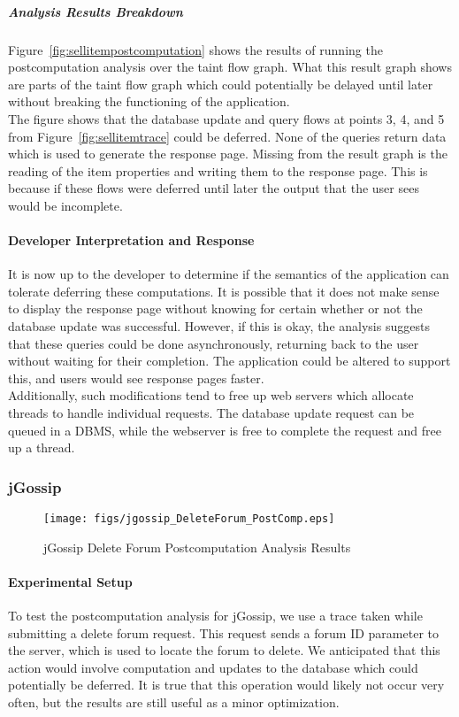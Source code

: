 \documentclass[msc,oneside]{ubcthesis}
\begin{document}
\subparagraph{Analysis Results Breakdown}
Figure~\ref{fig:sellitempostcomputation} shows the results of running the postcomputation analysis over the taint flow graph. What this result graph shows are parts of the taint flow graph which could potentially be delayed until later without breaking the functioning of the application.\\

The figure shows that the database update and query flows at points 3, 4, and 5 from Figure~\ref{fig:sellitemtrace} could be deferred. None of the queries return data which is used to generate the response page. Missing from the result graph is the reading of the item properties and writing them to the response page. This is because if these flows were deferred until later the output that the user sees would be incomplete.

\paragraph{Developer Interpretation and Response}
It is now up to the developer to determine if the semantics of the application can tolerate deferring these computations. It is possible that it does not make sense to display the response page without knowing for certain whether or not the database update was successful. However, if this is okay, the analysis suggests that these queries could be done asynchronously, returning back to the user without waiting for their completion. The application could be altered to support this, and users would see response pages faster. \\

Additionally, such modifications tend to free up web servers which allocate threads to handle individual requests. The database update request can be queued in a DBMS, while the webserver is free to complete the request and free up a thread.

\subsubsection{jGossip} 

\begin{sidewaysfigure}
\centering
\scalebox{0.5}
{\texttt{[image: figs/jgossip\_DeleteForum\_PostComp.eps]}}
\caption{jGossip Delete Forum Postcomputation Analysis Results} 
\label{fig:deleteforumpostcomputation}
\end{sidewaysfigure}

\paragraph{Experimental Setup}
To test the postcomputation analysis for jGossip, we use a trace taken while submitting a delete forum request. This request sends a forum ID parameter to the server, which is used to locate the forum to delete. We anticipated that this action would involve computation and updates to the database which could potentially be deferred. It is true that this operation would likely not occur very often, but the results are still useful as a minor optimization. \\
\end{document}
